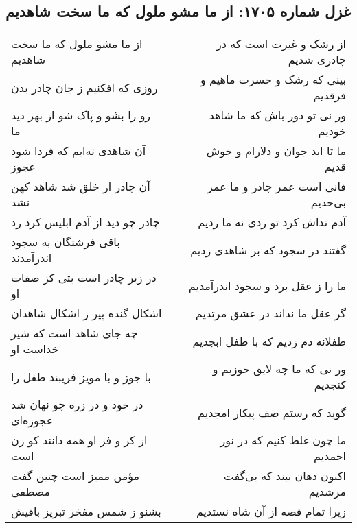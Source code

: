 \begin{center}
\section*{غزل شماره ۱۷۰۵: از ما مشو ملول که ما سخت شاهدیم}
\label{sec:1705}
\begin{longtable}{l p{0.5cm} r}
از ما مشو ملول که ما سخت شاهدیم
&&
از رشک و غیرت است که در چادری شدیم
\\
روزی که افکنیم ز جان چادر بدن
&&
بینی که رشک و حسرت ماهیم و فرقدیم
\\
رو را بشو و پاک شو از بهر دید ما
&&
ور نی تو دور باش که ما شاهد خودیم
\\
آن شاهدی نه‌ایم که فردا شود عجوز
&&
ما تا ابد جوان و دلارام و خوش قدیم
\\
آن چادر ار خلق شد شاهد کهن نشد
&&
فانی است عمر چادر و ما عمر بی‌حدیم
\\
چادر چو دید از آدم ابلیس کرد رد
&&
آدم نداش کرد تو ردی نه ما ردیم
\\
باقی فرشتگان به سجود اندرآمدند
&&
گفتند در سجود که بر شاهدی زدیم
\\
در زیر چادر است بتی کز صفات او
&&
ما را ز عقل برد و سجود اندرآمدیم
\\
اشکال گنده پیر ز اشکال شاهدان
&&
گر عقل ما نداند در عشق مرتدیم
\\
چه جای شاهد است که شیر خداست او
&&
طفلانه دم زدیم که با طفل ابجدیم
\\
با جوز و با مویز فریبند طفل را
&&
ور نی که ما چه لایق جوزیم و کنجدیم
\\
در خود و در زره چو نهان شد عجوزه‌ای
&&
گوید که رستم صف پیکار امجدیم
\\
از کر و فر او همه دانند کو زن است
&&
ما چون غلط کنیم که در نور احمدیم
\\
مؤمن ممیز است چنین گفت مصطفی
&&
اکنون دهان ببند که بی‌گفت مرشدیم
\\
بشنو ز شمس مفخر تبریز باقیش
&&
زیرا تمام قصه از آن شاه نستدیم
\\
\end{longtable}
\end{center}
